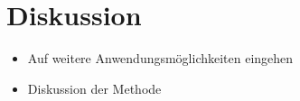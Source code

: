 %
%
%
%

\section{Diskussion\label{neuronal:section:diskussion}}

\begin{itemize}
    \item Auf weitere Anwendungsmöglichkeiten eingehen
    \item Diskussion der Methode
\end{itemize}


